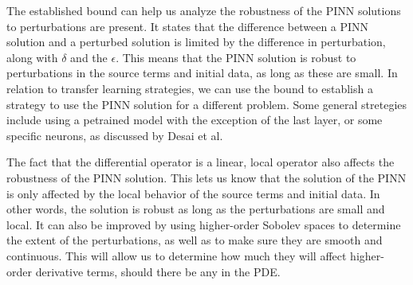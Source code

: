 \documentclass[unicode,11pt,a4paper,oneside,numbers=endperiod,openany]{scrartcl}
\begin{document}

The established bound can help us analyze the robustness of the PINN solutions
to perturbations are present.
It states that the difference between a PINN solution and a perturbed solution
is limited by the difference in perturbation, along with $\delta$ and the
$\epsilon$.
This means that the PINN solution is robust to perturbations in the source
terms and initial data, as long as these are small. In relation to
transfer learning strategies, we can use the bound to establish a strategy to
use the PINN solution for a different problem. Some general stretegies include
using a petrained model with the exception of the last layer, or some specific
neurons, as discussed by Desai et al. \cite{bajaj2021recipes}

The fact that the differential operator is a linear, local operator also affects
the robustness of the PINN solution. This lets us know that the solution of the
PINN is only affected by the local behavior of the source terms and initial
data.
In other words, the solution is robust as long as the perturbations are small
and local. 
It can also be improved by using higher-order Sobolev spaces to determine the
extent of the perturbations, as well as to make sure they are smooth and
continuous. This will allow us to determine how much they will affect
higher-order derivative terms, should there be any in the PDE.
    


\end{document}
